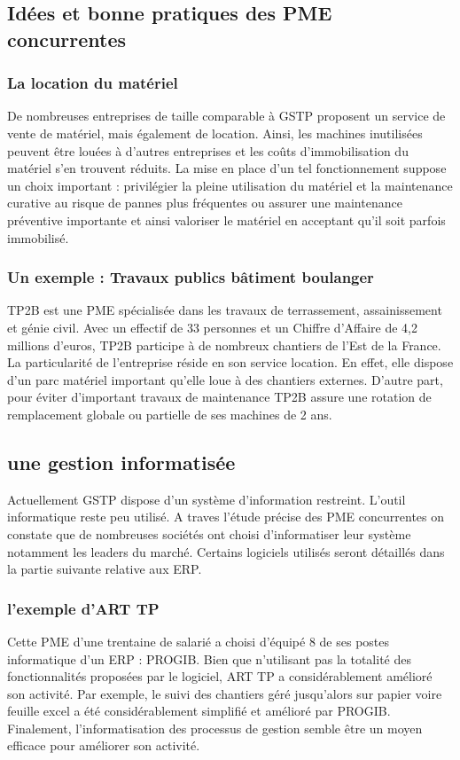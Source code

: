 		\subsection{Idées et bonne pratiques des PME concurrentes}
				\subsubsection{La location du matériel}
				De nombreuses entreprises de taille comparable à GSTP proposent un service de vente de matériel, mais également de location. 
Ainsi, les machines inutilisées peuvent être louées à d'autres entreprises et les coûts d'immobilisation du matériel s'en trouvent réduits. 
La mise en place d'un tel fonctionnement suppose un choix important : 
privilégier la pleine utilisation du matériel et la maintenance curative au risque de pannes plus fréquentes
ou assurer une maintenance préventive importante et ainsi valoriser le matériel en acceptant qu'il soit parfois immobilisé.

				\subsubsection{Un exemple : Travaux publics bâtiment boulanger}
				TP2B est une PME spécialisée dans les travaux de terrassement, assainissement et génie civil. Avec un effectif de 33 personnes et un Chiffre d'Affaire de 4,2 millions d'euros,
TP2B participe à de nombreux chantiers de l'Est de la France. La particularité de l'entreprise réside en son service location. En effet, elle dispose d'un parc matériel important qu'elle loue à des chantiers externes. D'autre part, pour éviter d'important travaux de maintenance TP2B assure une rotation de remplacement globale ou partielle de ses machines de 2 ans.

				\subsection{une gestion informatisée}
				Actuellement GSTP dispose d'un système d'information restreint. L'outil informatique reste peu utilisé.
A traves l'étude précise des PME concurrentes on constate que de nombreuses sociétés ont choisi d'informatiser leur système notamment les leaders du marché. Certains logiciels utilisés seront détaillés dans la partie suivante relative aux ERP.

				\subsubsection{l'exemple d'ART TP}
				Cette PME d'une trentaine de salarié a choisi d'équipé 8 de ses postes informatique d'un ERP : PROGIB. Bien que n'utilisant pas la totalité des fonctionnalités proposées par le logiciel, ART TP a considérablement amélioré son activité. Par exemple, le suivi des chantiers géré jusqu'alors sur papier voire feuille excel a été considérablement simplifié et amélioré par PROGIB. Finalement, l'informatisation des processus de gestion semble être un moyen efficace pour améliorer son activité.


